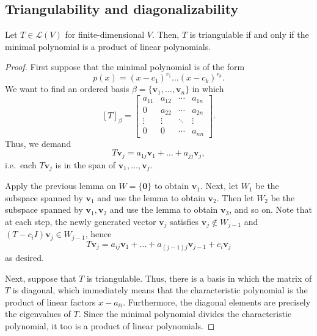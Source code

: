 \documentclass[11pt]{article}
\renewcommand{\vec}[1]{\boldsymbol{#1}}
\newcommand{\vv}{\vec{v}}
\newcommand{\alg}[1]{\mathscr{#1}}
\theoremstyle{definition}
\theoremstyle{remark}
\numberwithin{equation}{section}
\begin{document}
    \subsection{Triangulability and diagonalizability}
    

    \begin{theorem} \label{theorem:triangulation}
        Let $T \in \alg{L}(V)$ for finite-dimensional $V$. Then, $T$ is triangulable
        if and only if the minimal polynomial is a product of linear polynomials.
    \end{theorem}
    \begin{proof}
        First suppose that the minimal polynomial is of the form \[
            p(x) = (x - c_1)^{r_1} \dots (x - c_k)^{r_k}.
        \] We want to find an ordered basis $\beta = \{\vv_1, \dots, \vv_n\}$ in
        which \[
            [T]_\beta = \begin{bmatrix}
                a_{11} & a_{12} & \cdots & a_{1n} \\
                0      & a_{22} & \cdots & a_{2n} \\
                \vdots & \vdots & \ddots & \vdots \\
                0      & 0      & \cdots & a_{nn}
            \end{bmatrix}.
        \] Thus, we demand \[
            T\vv_j = a_{1j}\vv_1 + \dots + a_{jj}\vv_j,
        \] i.e.\ each $T\vv_j$ is in the span of $\vv_1, \dots, \vv_j$.

        Apply the previous lemma on $W = \{\vec{0}\}$ to obtain $\vv_1$. Next, let
        $W_1$ be the subspace spanned by $\vv_1$ and use the lemma to obtain
        $\vv_2$. Then let $W_2$ be the subspace spanned by $\vv_1, \vv_2$ and
        use the lemma to obtain $\vv_3$, and so on. Note that at each step, the newly
        generated vector $\vv_j$ satisfies $\vv_j \notin W_{j - 1}$ and $(T -
        c_iI)\vv_j \in W_{j - 1}$, hence \[
            T\vv_j = a_{ij}\vv_1 + \dots + a_{(j-1)j}\vv_{j - 1} + c_i\vv_j
        \] as desired.

        Next, suppose that $T$ is triangulable. Thus, there is a basis in which the
        matrix of $T$ is diagonal, which immediately means that the characteristic
        polynomial is the product of linear factors $x - a_{ii}$. Furthermore, the
        diagonal elements are precisely the eigenvalues of $T$. Since the minimal
        polynomial divides the characteristic polynomial, it too is a product of
        linear polynomials.
    \end{proof}
\end{document}

